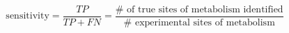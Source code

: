 \begin{equation}
\mathrm{sensitivity} = \frac{TP}{TP + FN} = \frac{\text{\#\ of\ true\ sites\ of\ metabolism\ identified}}{\text{\#\ experimental\ sites\ of\ metabolism}}
\end{equation}
